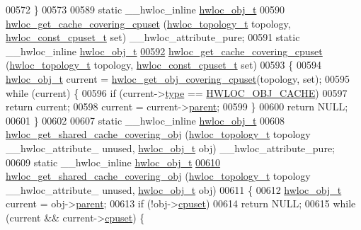 \begin{DoxyCode}
{{00572 \}
00573 
00589 \textcolor{keyword}{static} \_\_hwloc\_inline \hyperlink{a00016}{hwloc_obj_t}
00590 \hyperlink{a00057_ga2f936fd9a9c62f6d9b9951de3062e889}{hwloc_get_cache_covering_cpuset} (\hyperlink{a00039_ga9d1e76ee15a7dee158b786c30b6a6e38}{hwloc_topology_t} topology, \hyperlink{a00040_ga1f784433e9b606261f62d1134f6a3b25}{hwloc_const_cpuset_t} 
      \textcolor{keyword}{set}) \_\_hwloc\_attribute\_pure;
00591 static \_\_hwloc\_inline \hyperlink{a00016}{hwloc_obj_t}
\hypertarget{a00031_source_l00592}{}\hyperlink{a00057_ga2f936fd9a9c62f6d9b9951de3062e889}{00592} \hyperlink{a00057_ga2f936fd9a9c62f6d9b9951de3062e889}{hwloc_get_cache_covering_cpuset} (\hyperlink{a00039_ga9d1e76ee15a7dee158b786c30b6a6e38}{hwloc_topology_t} topology, \hyperlink{a00040_ga1f784433e9b606261f62d1134f6a3b25}{hwloc_const_cpuset_t} 
      set)
00593 \{
00594   \hyperlink{a00016}{hwloc_obj_t} current = \hyperlink{a00055_ga68300dd0ee9c36a7a90f275a59e9af28}{hwloc_get_obj_covering_cpuset}(topology, \textcolor{keyword}{set});
00595   \textcolor{keywordflow}{while} (current) \{
00596     \textcolor{keywordflow}{if} (current->\hyperlink{a00016_acc4f0803f244867e68fe0036800be5de}{type} == \hyperlink{a00041_ggacd37bb612667dc437d66bfb175a8dc55a56ee0b7eca88f363b75b34fdde8c9ddc}{HWLOC_OBJ_CACHE})
00597       \textcolor{keywordflow}{return} current;
00598     current = current->\hyperlink{a00016_adc494f6aed939992be1c55cca5822900}{parent};
00599   \}
00600   \textcolor{keywordflow}{return} NULL;
00601 \}
00602 
00607 \textcolor{keyword}{static} \_\_hwloc\_inline \hyperlink{a00016}{hwloc_obj_t}
00608 \hyperlink{a00057_ga000e08a1da039130daa072e77713bb43}{hwloc_get_shared_cache_covering_obj} (\hyperlink{a00039_ga9d1e76ee15a7dee158b786c30b6a6e38}{hwloc_topology_t} topology \_\_hwloc\_attribute\_
      unused, \hyperlink{a00016}{hwloc_obj_t} obj) \_\_hwloc\_attribute\_pure;
00609 \textcolor{keyword}{static} \_\_hwloc\_inline \hyperlink{a00016}{hwloc_obj_t}
\hypertarget{a00031_source_l00610}{}\hyperlink{a00057_ga000e08a1da039130daa072e77713bb43}{00610} \hyperlink{a00057_ga000e08a1da039130daa072e77713bb43}{hwloc_get_shared_cache_covering_obj} (\hyperlink{a00039_ga9d1e76ee15a7dee158b786c30b6a6e38}{hwloc_topology_t} topology \_\_hwloc\_attribute\_
      unused, \hyperlink{a00016}{hwloc_obj_t} obj)
00611 \{
00612   \hyperlink{a00016}{hwloc_obj_t} current = obj->\hyperlink{a00016_adc494f6aed939992be1c55cca5822900}{parent};
00613   \textcolor{keywordflow}{if} (!obj->\hyperlink{a00016_a67925e0f2c47f50408fbdb9bddd0790f}{cpuset})
00614     \textcolor{keywordflow}{return} NULL;
00615   \textcolor{keywordflow}{while} (current && current->\hyperlink{a00016_a67925e0f2c47f50408fbdb9bddd0790f}{cpuset}) \{
}}
\end{DoxyCode}

